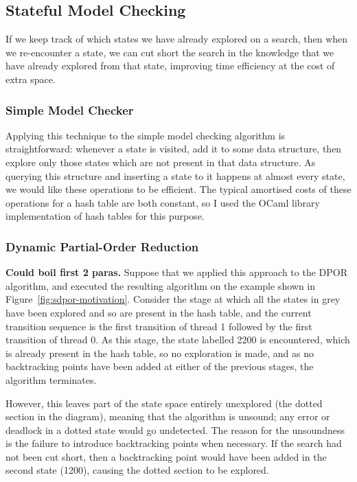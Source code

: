 \documentclass[12pt,a4paper,twoside,openright]{report}
\begin{document}
\subsection{Stateful Model Checking}
If we keep track of which states we have
already explored on a search, then when
we re-encounter a state, we can cut short
the search in the knowledge that we have
already explored from that state, improving
time efficiency at the cost of extra space.

\subsubsection{Simple Model Checker}

Applying this technique to the simple model
checking algorithm is straightforward: whenever
a state is visited, add it to some data structure,
then explore only those states which are not
present in that data structure. As querying
this structure and inserting a state to it
happens at almost every state, we would like these
operations to be efficient. The typical amortised costs
of these operations for a hash table are both
constant, so I used the OCaml library implementation
of hash tables for this purpose.

\subsubsection{Dynamic Partial-Order Reduction}
\textbf{Could boil first 2 paras.}
Suppose that we applied this approach
to the DPOR algorithm,
and executed the resulting algorithm
on the example shown in
Figure~\ref{fig:sdpor-motivation}.
Consider the stage at which
all the states in grey have been
explored and so are present in the hash table,
and the current transition sequence is the first
transition of thread 1 followed by the first
transition of thread 0. As this stage, the state
labelled 2200 is encountered, which is already
present in the hash table, so no exploration is
made, and as no backtracking points have been added
at either of the previous stages, the algorithm
terminates.

However, this leaves part of the state
space entirely unexplored (the dotted section in
the diagram), meaning that the algorithm is unsound;
any error or deadlock in a dotted state would go
undetected.
The reason for the unsoundness is the failure to
introduce backtracking points when necessary. If the
search had not been cut short, then a backtracking point
would have been added in the second state (1200), causing the
dotted section to be explored.
\end{document}
